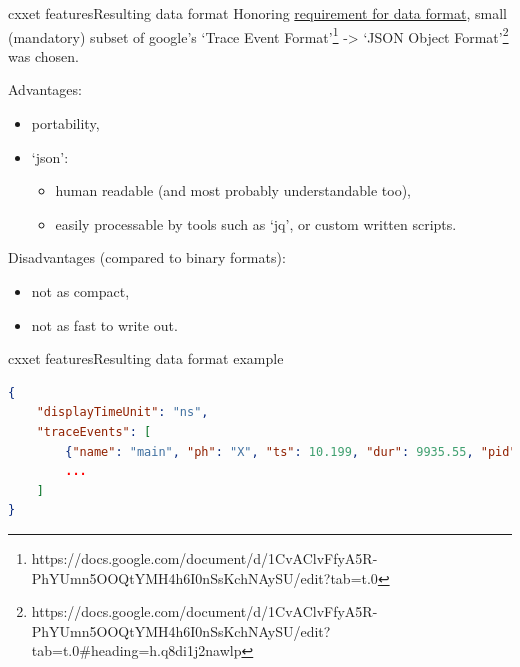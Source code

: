 \documentclass[aspectratio=169]{beamer}
\begin{document}
\begin{frame}{cxxet features}{Resulting data format}
    Honoring \hyperlink{data_format}{requirement for data format}, small (mandatory) subset of google's `Trace Event Format'\footnote{https://docs.google.com/document/d/1CvAClvFfyA5R-PhYUmn5OOQtYMH4h6I0nSsKchNAySU/edit?tab=t.0} -> `JSON Object Format'\footnote{https://docs.google.com/document/d/1CvAClvFfyA5R-PhYUmn5OOQtYMH4h6I0nSsKchNAySU/edit?tab=t.0\#heading=h.q8di1j2nawlp} was chosen.

    Advantages:

    \begin{itemize}
        \item portability,
        \item `json':
        \begin{itemize}
            \item human readable (and most probably understandable too),
            \item easily processable by tools such as `jq', or custom written scripts.
        \end{itemize}
    \end{itemize}

    Disadvantages (compared to binary formats):

    \begin{itemize}
        \item not as compact,
        \item not as fast to write out.
    \end{itemize}

\end{frame}

\begin{frame}[fragile]{cxxet features}{Resulting data format example}
    \begin{lstlisting}[language=json]
{
    "displayTimeUnit": "ns",
    "traceEvents": [
        {"name": "main", "ph": "X", "ts": 10.199, "dur": 9935.55, "pid": 220013, "tid": 220013},
        ...
    ]
}
    \end{lstlisting}

\end{frame}
\end{document}
